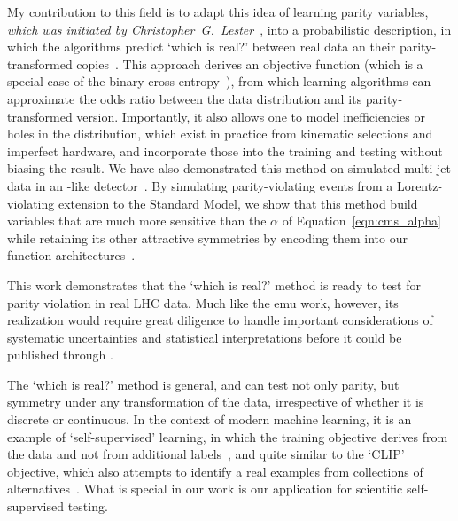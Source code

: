 My contribution to this field is to adapt this idea of learning parity
variables,
\emph{which was initiated by Christopher~G.~Lester}~\cite{lester2021stressed},
into a probabilistic description, in which the algorithms predict
`which is real?' between real data an their parity-transformed
copies~\cite{tombs2021which}.
This approach derives an objective function
(which is a special case of the binary
cross-entropy~\cite{MurphyKevinP.2012Mlap}),
from which learning algorithms
can approximate the odds ratio between the data distribution and its
parity-transformed version.
Importantly, it also allows one to model inefficiencies or holes in the
distribution, which exist in practice from kinematic selections and imperfect
hardware, and incorporate those into the training and testing without biasing
the result.
We have also demonstrated this method on simulated multi-jet data in an
\atlas-like detector~\cite{lester2022hunting}.
By simulating parity-violating events from a Lorentz-violating extension
to the Standard Model, we show that this method build variables that are much
more sensitive than the $\alpha$ of Equation~\ref{eqn:cms_alpha} while
retaining its other attractive symmetries by encoding them into our function
architectures~\cite{lester2021stressed, tombs2021which}.

This work demonstrates that the `which is real?' method is ready to test for
parity violation in real LHC data.
Much like the emu work, however, its realization would require great diligence
to handle important considerations of systematic uncertainties and statistical
interpretations before it could be published through \atlas.

The `which is real?' method is general, and can test not only parity, but
symmetry under any transformation of the data, irrespective of whether it is
discrete or continuous.
In the context of modern machine learning, it is an example of
`self-supervised' learning, in which the training objective derives from the
data and not from additional labels~\cite{
multitaskself2017,
devlin2019bert
}, and quite similar to the `CLIP' objective, which also attempts to identify
a real examples from collections of alternatives~\cite{pmlr-v139-radford21a}.
What is special in our work is our application for scientific self-supervised
testing.

